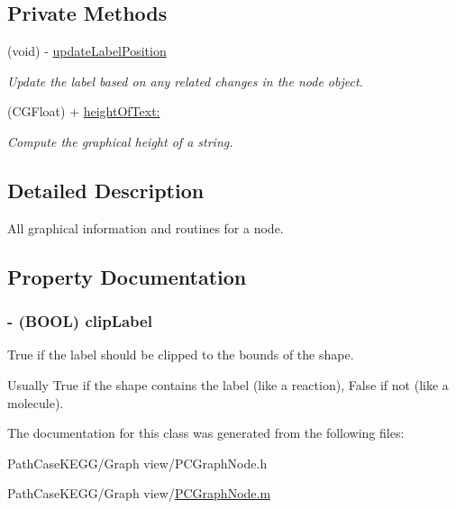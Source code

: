 \subsection*{Private Methods}
\begin{DoxyCompactItemize}
\item 
\hypertarget{interface_p_c_graph_node_ac084cb72ffc17d9deae4299c8902d7a2}{
(void) -\/ \hyperlink{interface_p_c_graph_node_ac084cb72ffc17d9deae4299c8902d7a2}{updateLabelPosition}}
\label{interface_p_c_graph_node_ac084cb72ffc17d9deae4299c8902d7a2}

\begin{DoxyCompactList}\small\item\em Update the label based on any related changes in the node object. \end{DoxyCompactList}\item 
\hypertarget{interface_p_c_graph_node_a5dbf84395dac44e8d2bbc8d2b0acb800}{
(CGFloat) + \hyperlink{interface_p_c_graph_node_a5dbf84395dac44e8d2bbc8d2b0acb800}{heightOfText:}}
\label{interface_p_c_graph_node_a5dbf84395dac44e8d2bbc8d2b0acb800}

\begin{DoxyCompactList}\small\item\em Compute the graphical height of a string. \end{DoxyCompactList}\end{DoxyCompactItemize}


\subsection{Detailed Description}
All graphical information and routines for a node. 

\subsection{Property Documentation}
\hypertarget{interface_p_c_graph_node_a76c958b98811dfd4e49955d253859f10}{
\subsubsection[{clipLabel}]{\setlength{\rightskip}{0pt plus 5cm}-\/ (BOOL) clipLabel}}
\label{interface_p_c_graph_node_a76c958b98811dfd4e49955d253859f10}


True if the label should be clipped to the bounds of the shape. 

Usually True if the shape contains the label (like a reaction), False if not (like a molecule). 

The documentation for this class was generated from the following files:\begin{DoxyCompactItemize}
\item 
PathCaseKEGG/Graph view/PCGraphNode.h\item 
PathCaseKEGG/Graph view/\hyperlink{_p_c_graph_node_8m}{PCGraphNode.m}\end{DoxyCompactItemize}
